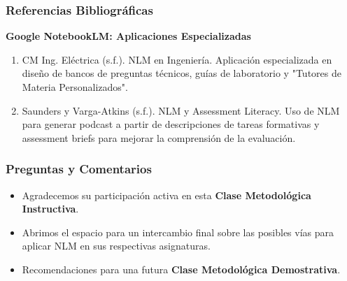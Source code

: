 \documentclass[aspectratio=43]{beamer}
\begin{document}
\begin{frame}
  \frametitle{ Referencias Bibliográficas}
  
  \textbf{Google NotebookLM: Aplicaciones Especializadas}
  \begin{enumerate}
      \item CM Ing. Eléctrica (s.f.). NLM en Ingeniería. Aplicación especializada en diseño de bancos de preguntas técnicos, guías de laboratorio y "Tutores de Materia Personalizados".
      \item Saunders y Varga-Atkins (s.f.). NLM y Assessment Literacy. Uso de NLM para generar podcast a partir de descripciones de tareas formativas y assessment briefs para mejorar la comprensión de la evaluación.
  \end{enumerate}
\end{frame}

\begin{frame}
\frametitle{ Preguntas y Comentarios }
\begin{itemize}
    \item Agradecemos su participación activa en esta \textbf{Clase Metodológica Instructiva}.
    \item Abrimos el espacio para un intercambio final sobre las posibles vías para aplicar NLM en sus respectivas asignaturas.
    \item Recomendaciones para una futura \textbf{Clase Metodológica Demostrativa}.
\end{itemize}
\end{frame}
\end{document}
